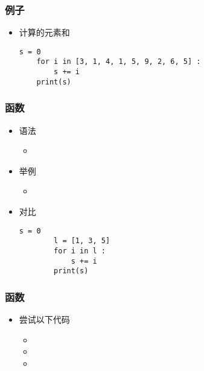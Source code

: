 \begin{CJK}{UTF8}{gbsn}
\begin{frame} [fragile]
	\frametitle{例子}
	\linespread{1.25}
	\begin{itemize}
	\item 计算\inlinePython{[3, 1, 4, 1, 5, 9, 2, 6, 5]}的元素和
	\begin{lstlisting}[style=pythonstyle, gobble=4, texcl]
	s = 0
	for i in [3, 1, 4, 1, 5, 9, 2, 6, 5] :
		s += i
	print(s)
	\end{lstlisting}
	\end{itemize}
\end{frame}

\begin{frame} [fragile]
	\frametitle{函数}
	\linespread{1.25}
	\begin{itemize}
	\item 语法
		\begin{itemize}
		\item {}
		\end{itemize}
	\item 举例
		\begin{itemize}
		\item {}
		\end{itemize}
	\item 对比
		\begin{lstlisting}[style=pythonstyle, gobble=8, texcl]
		s = 0
		l = [1, 3, 5]
		for i in l :
			s += i
		print(s)
		\end{lstlisting}
	\end{itemize}
\end{frame}

\begin{frame} [fragile]
	\frametitle{函数}
	\linespread{1.5}
	\begin{itemize}
	\item 尝试以下代码
		\begin{itemize}
		\item {}
		\item {}
		\item {}
		\end{itemize}
	\end{itemize}
\end{frame}


\end{CJK}
